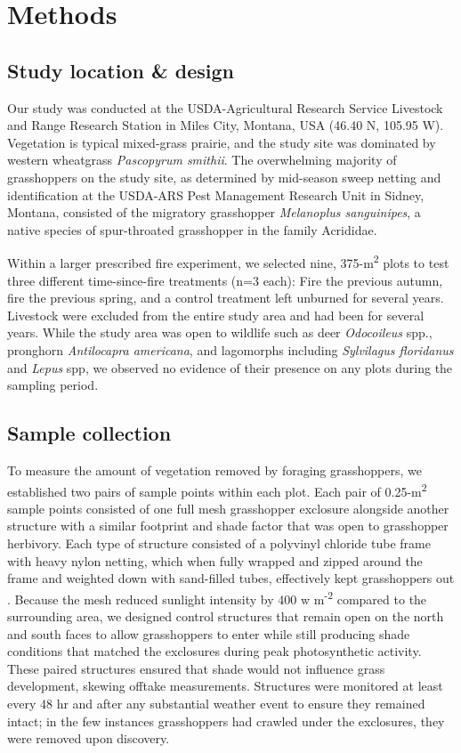 \documentclass[referee, 
	            sn-basic]
           {sn-jnl}
\begin{document}
\section{Methods}

\subsection{Study location \& design} 

Our study was conducted at the USDA-Agricultural Research Service Livestock and Range Research Station in Miles City, Montana, USA (46.40 N, 105.95 W).  
Vegetation is typical mixed-grass prairie, and the study site was dominated by western wheatgrass \emph{Pascopyrum smithii}.  
The overwhelming majority of grasshoppers on the study site, as determined by mid-season sweep netting and identification at the USDA-ARS Pest Management Research Unit in Sidney, Montana, consisted of the migratory grasshopper \emph{Melanoplus sanguinipes}, a native species of spur-throated grasshopper in the family Acrididae. 

Within a larger prescribed fire experiment, we selected nine, 375-m\textsuperscript{2} plots to test three different time-since-fire treatments (n=3 each): Fire the previous autumn, fire the previous spring, and a control treatment left unburned for several years. 
Livestock were excluded from the entire study area and had been for several years.
While the study area was open to wildlife such as deer \emph{Odocoileus} spp., pronghorn \emph{Antilocapra americana}, and lagomorphs including \emph{Sylvilagus floridanus} and \emph{Lepus} spp, we observed no evidence of their presence on any plots during the sampling period. 

\subsection{Sample collection}

To measure the amount of vegetation removed by foraging grasshoppers, we established two pairs of sample points within each plot. 
Each pair of 0.25-m\textsuperscript{2} sample points consisted of one full mesh grasshopper exclosure alongside another structure with a similar footprint and shade factor that was open to grasshopper herbivory.
Each type of structure consisted of a polyvinyl chloride tube frame with heavy nylon netting, which when fully wrapped and zipped around the frame and weighted down with sand-filled tubes, effectively kept grasshoppers out \citep{parker1985}. 
Because the mesh reduced sunlight intensity by 400 w m\textsuperscript{-2} compared to the
surrounding area, we designed control structures that remain open on the north and south faces to allow grasshoppers to enter while still producing shade conditions that matched the exclosures during peak photosynthetic activity. 
These paired structures ensured that shade would not influence grass development, skewing offtake measurements. 
Structures were monitored at least every 48 hr and after any substantial weather event to ensure they remained intact; in the few instances grasshoppers had crawled under the exclosures, they were removed upon discovery. 
\end{document}
